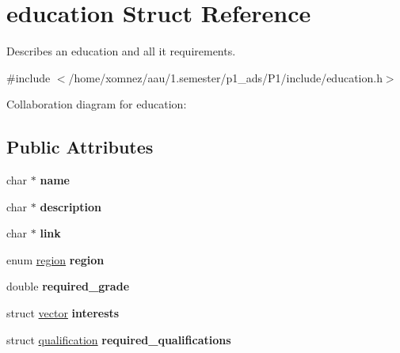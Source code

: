 \hypertarget{structeducation}{}\section{education Struct Reference}
\label{structeducation}


Describes an education and all it requirements.  




{\ttfamily \#include $<$/home/xomnez/aau/1.\+semester/p1\+\_\+ads/\+P1/include/education.\+h$>$}



Collaboration diagram for education\+:
\subsection*{Public Attributes}
\begin{DoxyCompactItemize}
\item 
\mbox{\label{structeducation_a67016708488af9826f66da80b2702e09}} 
char $\ast$ {\bfseries name}
\item 
\mbox{\label{structeducation_a24cdb1b8c614b0104b55dbfb57a12979}} 
char $\ast$ {\bfseries description}
\item 
\mbox{\label{structeducation_a0244d20a4b1f00a6088cece10b77a0f3}} 
char $\ast$ {\bfseries link}
\item 
\mbox{\label{structeducation_afbd04b27ec3401b2076f1a2806a4bd42}} 
enum \hyperlink{region_8h_a1b9edddb3735d131c67e9e824f07c402}{region} {\bfseries region}
\item 
\mbox{\label{structeducation_ab0bb73fcbd8c30cb1be9f01f7fa608cd}} 
double {\bfseries required\+\_\+grade}
\item 
\mbox{\label{structeducation_ae8ea10524118581a9ed1a93bafc5cc54}} 
struct \hyperlink{structvector}{vector} {\bfseries interests}
\item 
\mbox{\label{structeducation_a0e95ac75d550a79ae7e10e915adb59ac}} 
struct \hyperlink{structqualification}{qualification} {\bfseries required\+\_\+qualifications}
\end{DoxyCompactItemize}


